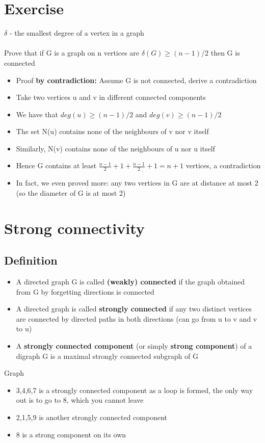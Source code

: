 \documentclass{article}[18pt]
\begin{document}
\section{Exercise}
$\delta$  - the smallest degree of a vertex in a graph\\
\\
Prove that if G is a graph on n vertices are $\delta(G)\geqslant (n-1)/2$ then G is connected
\begin{itemize}
	\item Proof \textbf{by contradiction:} Assume G is not connected, derive a contradiction
	\item Take two vertices u and v in different connected components
	\item We have that $deg(u)\geqslant (n-1)/2$ and $deg(v)\geqslant (n-1)/2$
	\item The set N(u) contains none of the neighbours of v nor v itself
	\item Similarly, N(v)  contains none of the neighbours of u nor u itself
	\item Hence G contains at least $\frac { n - 1 } { 2 } + 1 + \frac { n - 1 } { 2 } + 1 = n + 1$ vertices, a contradiction
	\item In fact, we even proved more: any two vertices in G are at distance at most 2 (so the diameter of G is at most 2)
\end{itemize}
\section{Strong connectivity}
\subsection{Definition}
\begin{itemize}
	\item A directed graph G is called \textbf{(weakly) connected} if the graph obtained from G by forgetting directions is connected
	\item A directed graph is called \textbf{strongly connected} if any two distinct vertices are connected by directed paths in both directions (can go from u to v and v to u)
	\item A \textbf{strongly connected component} (or simply \textbf{strong component}) of a digraph G is a maximal strongly connected subgraph of G
\end{itemize}
Graph
\begin{itemize}
	\item 3,4,6,7 is a strongly connected component as a loop is formed, the only way out is to go to 8, which you cannot leave
	\item 2,1,5,9 is another strongly connected component
	\item 8 is a strong component on its own
\end{itemize}
\end{document}
